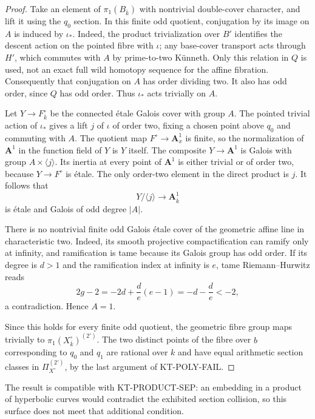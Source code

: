 \documentclass[11pt,a4paper]{article}
\theoremstyle{definition}
\begin{document}
\begin{proof}
Take an element of $\pi_1(B_{\overline k})$ with nontrivial
double-cover character, and lift it using the $q_0$ section.
In this finite odd quotient, conjugation by its image on $A$
is induced by $\iota_*$. Indeed, the product trivialization
over $B'$ identifies the descent action on the pointed fibre
with $\iota$; any base-cover transport acts through $H'$, which
commutes with $A$ by prime-to-two K\"unneth. Only this relation
in $Q$ is used, not an exact full wild homotopy sequence for
the affine fibration. Consequently that conjugation on $A$
has order dividing two. It also has odd order, since $Q$ has
odd order. Thus $\iota_*$ acts trivially on $A$.

Let $Y\to F^\circ_{\overline k}$ be the connected \'etale
Galois cover with group $A$. The pointed trivial action of
$\iota_*$ gives a lift $j$ of $\iota$ of order two, fixing a
chosen point above $q_0$ and commuting with $A$.
The quotient map $F^\circ\to\mathbf A^1_x$ is finite, so
the normalization of $\mathbf A^1$ in the function field of
$Y$ is $Y$ itself. The composite $Y\to\mathbf A^1$ is
Galois with group $A\times\langle j\rangle$. Its inertia
at every point of $\mathbf A^1$ is either trivial or of
order two, because $Y\to F^\circ$ is \'etale. The only
order-two element in the direct product is $j$.
It follows that
\[
 Y/\langle j\rangle\longrightarrow\mathbf A^1_{\overline k}
\]
is \'etale and Galois of odd degree $|A|$.

There is no nontrivial finite odd Galois \'etale cover of the
geometric affine line in characteristic two. Indeed, its
smooth projective compactification can ramify only at infinity,
and ramification is tame because its Galois group has odd order.
If its degree is $d>1$ and the ramification index at infinity
is $e$, tame Riemann--Hurwitz reads
\[
 2g-2=-2d+\frac d e(e-1)=-d-\frac d e<-2,
\]
a contradiction. Hence $A=1$.

Since this holds for every finite odd quotient, the geometric
fibre group maps trivially to
$\pi_1(X^\circ_{\overline k})^{(2')}$.
The two distinct points of the fibre over $b$ corresponding
to $q_0$ and $q_1$ are rational over $k$ and have equal
arithmetic section classes in $\Pi_{X^\circ}^{(2')}$,
by the last argument of KT-POLY-FAIL.
\end{proof}

The result is compatible with KT-PRODUCT-SEP: an embedding
in a product of hyperbolic curves would contradict the
exhibited section collision, so this surface does not meet
that additional condition.
\end{document}
